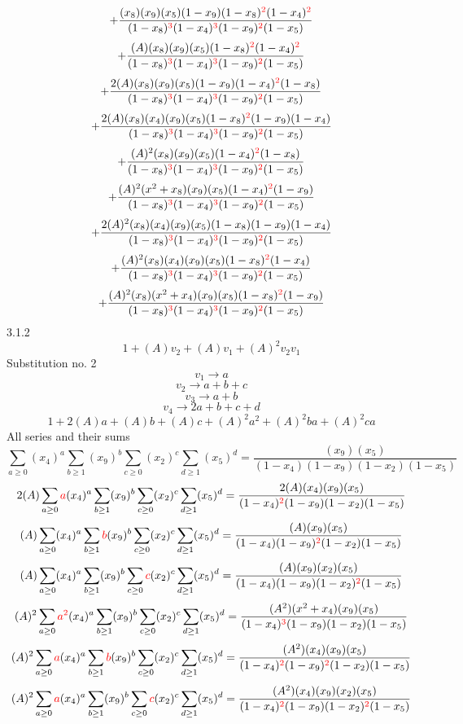 \documentclass{article}
\begin{document}
\[+\frac{(x_8)(x_9)(x_5)(1-x_9)(1-x_8)^{\textcolor{red}{2}}(1-x_4)^{\textcolor{red}{2}}}{(1-x_8)^{\textcolor{red}{3}}(1-x_4)^{\textcolor{red}{3}}(1-x_9)^{\textcolor{red}{2}}(1-x_5)}\]\[+\frac{(A)(x_8)(x_9)(x_5)(1-x_8)^{\textcolor{red}{2}}(1-x_4)^{\textcolor{red}{2}}}{(1-x_8)^{\textcolor{red}{3}}(1-x_4)^{\textcolor{red}{3}}(1-x_9)^{\textcolor{red}{2}}(1-x_5)}\]\[+\frac{2(A)(x_8)(x_9)(x_5)(1-x_9)(1-x_4)^{\textcolor{red}{2}}(1-x_8)}{(1-x_8)^{\textcolor{red}{3}}(1-x_4)^{\textcolor{red}{3}}(1-x_9)^{\textcolor{red}{2}}(1-x_5)}\]\[+\frac{2(A)(x_8)(x_4)(x_9)(x_5)(1-x_8)^{\textcolor{red}{2}}(1-x_9)(1-x_4)}{(1-x_8)^{\textcolor{red}{3}}(1-x_4)^{\textcolor{red}{3}}(1-x_9)^{\textcolor{red}{2}}(1-x_5)}\]\[+\frac{(A)^{2}(x_8)(x_9)(x_5)(1-x_4)^{\textcolor{red}{2}}(1-x_8)}{(1-x_8)^{\textcolor{red}{3}}(1-x_4)^{\textcolor{red}{3}}(1-x_9)^{\textcolor{red}{2}}(1-x_5)}\]\[+\frac{(A)^{2}(x^{2}+x_8)(x_9)(x_5)(1-x_4)^{\textcolor{red}{2}}(1-x_9)}{(1-x_8)^{\textcolor{red}{3}}(1-x_4)^{\textcolor{red}{3}}(1-x_9)^{\textcolor{red}{2}}(1-x_5)}\]\[+\frac{2(A)^{2}(x_8)(x_4)(x_9)(x_5)(1-x_8)(1-x_9)(1-x_4)}{(1-x_8)^{\textcolor{red}{3}}(1-x_4)^{\textcolor{red}{3}}(1-x_9)^{\textcolor{red}{2}}(1-x_5)}\]\[+\frac{(A)^{2}(x_8)(x_4)(x_9)(x_5)(1-x_8)^{\textcolor{red}{2}}(1-x_4)}{(1-x_8)^{\textcolor{red}{3}}(1-x_4)^{\textcolor{red}{3}}(1-x_9)^{\textcolor{red}{2}}(1-x_5)}\]\[+\frac{(A)^{2}(x_8)(x^{2}+x_4)(x_9)(x_5)(1-x_8)^{\textcolor{red}{2}}(1-x_9)}{(1-x_8)^{\textcolor{red}{3}}(1-x_4)^{\textcolor{red}{3}}(1-x_9)^{\textcolor{red}{2}}(1-x_5)}\]
3.1.2
\[1+(A)v_2+(A)v_1+(A)^2v_2v_1\]Substitution no. 2\[v_1\rightarrow{a}\]\[v_2\rightarrow{a+b+c}\]\[v_3\rightarrow{a+b}\]\[v_4\rightarrow{2a+b+c+d}\]\[1+2(A)a+(A)b+(A)c+(A)^2a^{2}+(A)^2ba+(A)^2ca\]All series and their sums\[\sum_{a\geq{0}}(x_4)^{a}\sum_{b\geq{1}}(x_9)^{b}\sum_{c\geq{0}}(x_2)^{c}\sum_{d\geq{1}}(x_5)^{d}=\frac{(x_9)(x_5)}{(1-x_4)(1-x_9)(1-x_2)(1-x_5)}\]\[2(A)\sum_{a\geq{0}}\textcolor{red}{a}(x_4)^{a}\sum_{b\geq{1}}(x_9)^{b}\sum_{c\geq{0}}(x_2)^{c}\sum_{d\geq{1}}(x_5)^{d}=\frac{2(A)(x_4)(x_9)(x_5)}{(1-x_4)^{\textcolor{red}{2}}(1-x_9)(1-x_2)(1-x_5)}\]\[(A)\sum_{a\geq{0}}(x_4)^{a}\sum_{b\geq{1}}\textcolor{red}{b}(x_9)^{b}\sum_{c\geq{0}}(x_2)^{c}\sum_{d\geq{1}}(x_5)^{d}=\frac{(A)(x_9)(x_5)}{(1-x_4)(1-x_9)^{\textcolor{red}{2}}(1-x_2)(1-x_5)}\]\[(A)\sum_{a\geq{0}}(x_4)^{a}\sum_{b\geq{1}}(x_9)^{b}\sum_{c\geq{0}}\textcolor{red}{c}(x_2)^{c}\sum_{d\geq{1}}(x_5)^{d}=\frac{(A)(x_9)(x_2)(x_5)}{(1-x_4)(1-x_9)(1-x_2)^{\textcolor{red}{2}}(1-x_5)}\]\[(A)^{2}\sum_{a\geq{0}}\textcolor{red}{a^{2}}(x_4)^{a}\sum_{b\geq{1}}(x_9)^{b}\sum_{c\geq{0}}(x_2)^{c}\sum_{d\geq{1}}(x_5)^{d}=\frac{(A^{2})(x^{2}+x_4)(x_9)(x_5)}{(1-x_4)^{\textcolor{red}{3}}(1-x_9)(1-x_2)(1-x_5)}\]\[(A)^{2}\sum_{a\geq{0}}\textcolor{red}{a}(x_4)^{a}\sum_{b\geq{1}}\textcolor{red}{b}(x_9)^{b}\sum_{c\geq{0}}(x_2)^{c}\sum_{d\geq{1}}(x_5)^{d}=\frac{(A^{2})(x_4)(x_9)(x_5)}{(1-x_4)^{\textcolor{red}{2}}(1-x_9)^{\textcolor{red}{2}}(1-x_2)(1-x_5)}\]\[(A)^{2}\sum_{a\geq{0}}\textcolor{red}{a}(x_4)^{a}\sum_{b\geq{1}}(x_9)^{b}\sum_{c\geq{0}}\textcolor{red}{c}(x_2)^{c}\sum_{d\geq{1}}(x_5)^{d}=\frac{(A^{2})(x_4)(x_9)(x_2)(x_5)}{(1-x_4)^{\textcolor{red}{2}}(1-x_9)(1-x_2)^{\textcolor{red}{2}}(1-x_5)}\]
\end{document}
